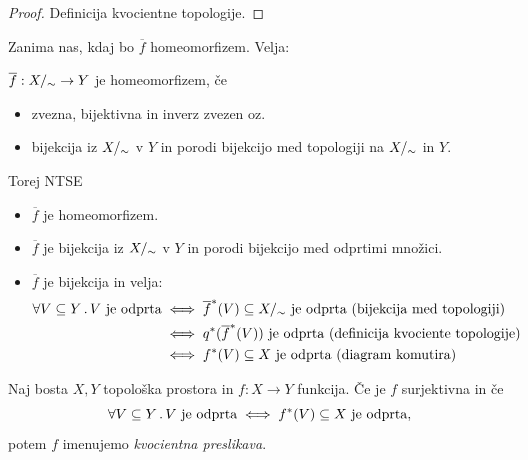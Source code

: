 \begin{proof}
    Definicija kvocientne topologije.
\end{proof}

\newpage
Zanima nas, kdaj bo \(\overline{f}\) homeomorfizem. Velja:

\(\overline{f}: {X/_\sim} \to Y\) je homeomorfizem, če 
\begin{itemize}
    \item zvezna, bijektivna in inverz zvezen oz.
    \item bijekcija iz \({X/_\sim}\) v \(Y\) in porodi bijekcijo med topologiji na \({X/_\sim}\) in \(Y\).
\end{itemize}
Torej NTSE
\begin{itemize}
    \item \(\overline{f}\) je homeomorfizem.
    \item \(\overline{f}\) je bijekcija iz \({X/_\sim}\) v \(Y\) in porodi bijekcijo med odprtimi množici.
    \item \(\overline{f}\) je bijekcija in velja:    
    \begin{align*}
        \forall V \subseteq Y \,.\, V \ \text{je odprta} &\iff \overline{f}^{*}(V) \subseteq {X/_\sim} \ \text{je odprta (bijekcija med topologiji)} \\
        &\iff q^{*}(\overline{f}^{*}(V)) \ \text{je odprta (definicija kvociente topologije)} \\
        &\iff f^{*}(V) \subseteq X \ \text{je odprta (diagram komutira)}
    \end{align*}
\end{itemize}

\begin{definicija}
    Naj bosta \(X, Y\) topološka prostora in \(f: X \to Y\) funkcija. Če je \(f\) surjektivna in če 
    \[\all{V \subseteq Y} V \ \text{je odprta} \liff \invimg{f}(V) \subseteq X \ \text{je odprta},\]
    potem \(f\) imenujemo \emph{kvocientna preslikava}.
\end{definicija}

